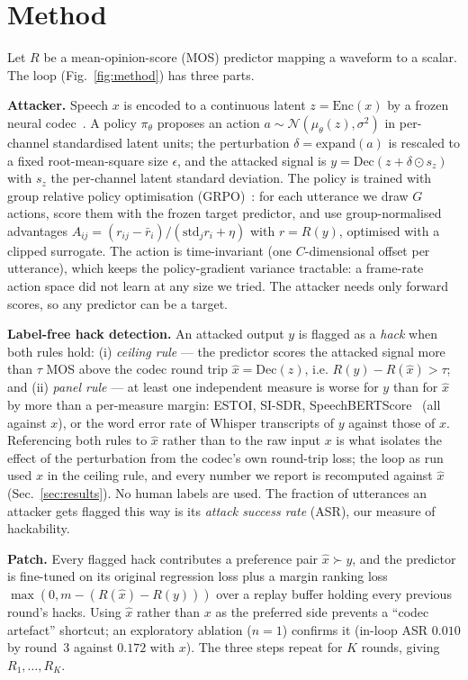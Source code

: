 \documentclass[conference]{IEEEtran}
\begin{document}
\section{Method}
\label{sec:method}
Let $R$ be a mean-opinion-score (MOS) predictor mapping a waveform to a scalar. The loop (Fig.~\ref{fig:method}) has three parts.

\noindent\textbf{Attacker.}
Speech $x$ is encoded to a continuous latent $z=\mathrm{Enc}(x)$ by a frozen neural codec~\cite{defossez2023encodec}. A policy
$\pi_\theta$ proposes an action $a\sim\mathcal{N}(\mu_\theta(z),\sigma^2)$ in per-channel standardised latent
units; the perturbation $\delta=\mathrm{expand}(a)$ is rescaled to a fixed root-mean-square size $\epsilon$,
and the attacked signal is $y=\mathrm{Dec}(z+\delta\odot s_z)$ with $s_z$ the per-channel latent standard
deviation. The policy is trained with group relative policy optimisation (GRPO)~\cite{shao2024grpo}: for each utterance we draw $G$ actions, score them with the frozen
target predictor, and use group-normalised advantages $A_{ij}=(r_{ij}-\bar r_i)/(\mathrm{std}_j r_i+\eta)$ with
$r=R(y)$, optimised with a clipped surrogate. The action is time-invariant (one $C$-dimensional offset per
utterance), which keeps the policy-gradient variance tractable: a frame-rate action space did not learn at any
size we tried. The attacker needs only forward scores, so any predictor can be a target.

\noindent\textbf{Label-free hack detection.}
An attacked output $y$ is flagged as a \emph{hack} when both rules hold:
(i) \emph{ceiling rule} --- the predictor scores the attacked signal more than $\tau$ MOS above the codec round
trip $\hat{x}=\mathrm{Dec}(z)$, i.e. $R(y)-R(\hat{x})>\tau$; and
(ii) \emph{panel rule} --- at least one independent measure is worse for $y$ than for $\hat{x}$ by more than a
per-measure margin: ESTOI, SI-SDR, SpeechBERTScore~\cite{saeki2024speechbertscore} (all against $x$),
or the word error rate of Whisper transcripts of $y$ against those of $x$.
Referencing both rules to $\hat{x}$ rather than to the raw input $x$ is what isolates the effect of the
perturbation from the codec's own round-trip loss; the loop as run used $x$ in the ceiling rule, and every
number we report is recomputed against $\hat{x}$ (Sec.~\ref{sec:results}). No human labels are used. The fraction of utterances an attacker gets flagged this
way is its \emph{attack success rate} (ASR), our measure of hackability.

\noindent\textbf{Patch.}
Every flagged hack contributes a preference pair $\hat{x}\succ y$, and the predictor is fine-tuned on its
original regression loss plus a margin ranking loss $\max(0, m-(R(\hat{x})-R(y)))$ over a replay buffer holding
every previous round's hacks. Using $\hat{x}$ rather than $x$ as the preferred side prevents a ``codec
artefact'' shortcut; an exploratory ablation ($n\!=\!1$) confirms it (in-loop ASR $0.010$ by round~3 against
$0.172$ with $x$). The three steps repeat for $K$ rounds, giving $R_1,\dots,R_K$.
\end{document}
